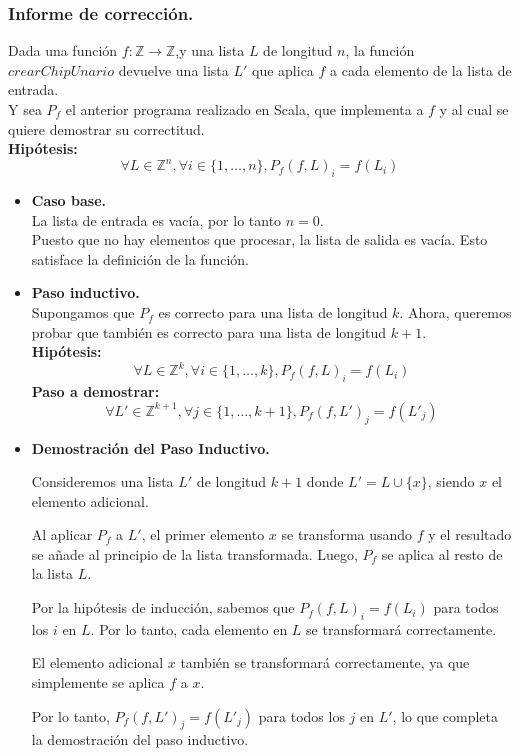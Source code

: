 \documentclass[12pt, a4paper]{article}
\begin{document}
\subsubsection{Informe de corrección.}
Dada una función $f: \mathbb{Z} \rightarrow \mathbb{Z}$,y una lista $L$ de longitud $n$, la función $crearChipUnario$ devuelve una lista $L'$ que aplica $f$ a cada elemento de la lista de entrada. \\ 
Y sea $P_f$ el anterior programa realizado en Scala, que implementa a $f$ y al cual se quiere demostrar su correctitud. \\
\textbf{Hipótesis:} 
\begin{displaymath}
  \forall L \in \mathbb{Z}^n, \forall i \in \{1, \dots, n\}, P_f(f, L)_i = f(L_i)
 \end{displaymath} 
 \begin{itemize}
  \item \textbf{Caso base.}\\
  La lista de entrada es vacía, por lo tanto $n = 0$. \\
  Puesto que no hay elementos que procesar, la lista de salida es vacía. Esto satisface la definición de la función. \\
  
  \item \textbf{Paso inductivo.} \\
  Supongamos que $P_f$ es correcto para una lista de longitud $k$. Ahora, queremos probar que también es correcto para una lista de longitud $k + 1$. \\
  

\textbf{Hipótesis:}
\[
\forall L \in \mathbb{Z}^k, \forall i \in \{1, \dots, k\}, P_f(f, L)_i = f(L_i)
\]
\textbf{Paso a demostrar:}
\[
\forall L' \in \mathbb{Z}^{k+1}, \forall j \in \{1, \dots, k+1\}, P_f(f, L')_j = f(L'_j)
\]

\item \textbf{Demostración del Paso Inductivo.}

Consideremos una lista \( L' \) de longitud \( k + 1 \) donde \( L' = L \cup \{x\} \), siendo \( x \) el elemento adicional.

Al aplicar $P_f$ a \( L' \), el primer elemento \( x \) se transforma usando \( f \) y el resultado se añade al principio de la lista transformada. Luego, $P_f$ se aplica al resto de la lista \( L \).

Por la hipótesis de inducción, sabemos que $P_f(f, L)_i = f(L_i)$ para todos los \( i \) en \( L \). Por lo tanto, cada elemento en \( L \) se transformará correctamente.

El elemento adicional \( x \) también se transformará correctamente, ya que simplemente se aplica \( f \) a \( x \).

Por lo tanto, $P_f(f, L')_j = f(L'_j)$ para todos los \( j \) en \( L' \), lo que completa la demostración del paso inductivo.
\end{itemize}
\end{document}
